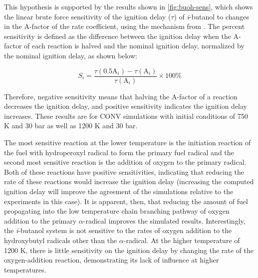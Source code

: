 \documentclass[12pt, letterpaper]{article}
\begin{document}
This hypothesis is supported by the results shown in \autoref{fig:buoh-sens},
which shows the linear brute force sensitivity of the ignition delay ($\tau$)
of \textit{i}-butanol to changes in the A-factor of the rate coefficient, using
the mechanism from \textcite{Sarathy2012}. The percent sensitivity is defined
as the difference between the ignition delay when the A-factor of each reaction
is halved and the nominal ignition delay, normalized by the nominal ignition
delay, as shown below:

\begin{equation}
    \label{eq:buoh-sens}
    S_i=\frac{\tau(0.5\mathrm{A}_i )-\tau(\mathrm{A}_i )}{\tau(\mathrm{A}_i)} \times 100\%
\end{equation}

Therefore, negative sensitivity means that halving the A-factor of a reaction
decreases the ignition delay, and positive sensitivity indicates the ignition
delay increases. These results are for CONV simulations with initial conditions
of 750 K and 30 bar as well as 1200 K and 30 bar.

The most sensitive reaction at the lower temperature is the initiation reaction
of the fuel with hydroperoxyl radical to form the primary fuel radical and the
second most sensitive reaction is the addition of oxygen to the primary
radical. Both of these reactions have positive sensitivities, indicating that
reducing the rate of these reactions would increase the ignition delay
(increasing the computed ignition delay will improve the agreement of the
simulations relative to the experiments in this case). It is apparent, then,
that reducing the amount of fuel propagating into the low temperature chain
branching pathway of oxygen addition to the primary $\alpha$-radical improves
the simulated results. Interestingly, the \textit{i}-butanol system is not
sensitive to the rates of oxygen addition to the hydroxybutyl radicals other
than the $\alpha$-radical. At the higher temperature of 1200 K, there is little
sensitivity on the ignition delay by changing the rate of the oxygen-addition
reaction, demonstrating its lack of influence at higher temperatures.
\end{document}
